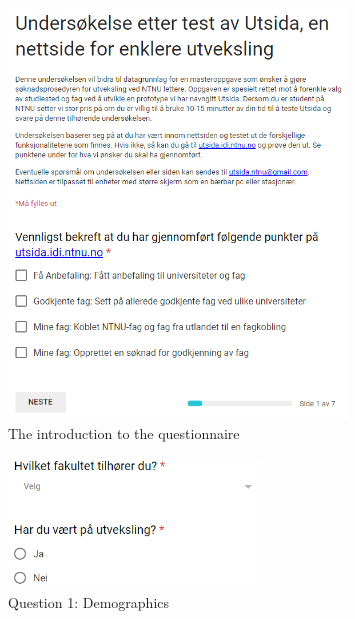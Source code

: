 \begin{figure}[h]
    \centering
    \includegraphics[width=0.8\textwidth]{fig/form2/front.PNG}
    \caption[]{The introduction to the questionnaire}
    \label{fig:questionnaire_2_questions_p1}
\end{figure}
\begin{figure}[h]
    \centering
    \includegraphics[width=0.6\textwidth]{fig/form2/s2.PNG}
    \caption[]{Question 1: Demographics}
    \label{fig:questionnaire_2_questions_p2}
\end{figure}
